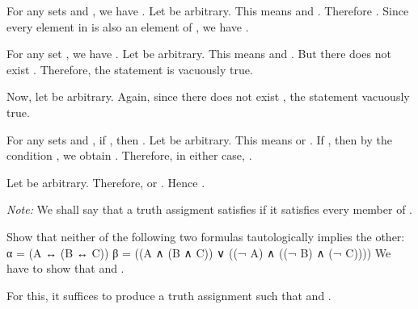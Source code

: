 \startexercises [title={\getvariable{document}{author}  \hfill  \getvariable{document}{course}  \hfill  2019-09-10}]
	
	\startexercise [title={Notes, 1.8}]
		For any sets  and , we have .
	\stopexercise
	\startsolution
		Let  be arbitrary. This means  and . Therefore . Since every element in  is also an element of , we have .
	\stopsolution

	\startexercise [title={Notes, 1.10}]
		For any set , we have .
	\stopexercise
	\startsolution
		Let  be arbitrary. This means  and . But there does not exist . Therefore, the statement is vacuously true.

		Now, let  be arbitrary. Again, since there does not exist , the statement vacuously true.
	\stopsolution

	\startexercise [title={Notes, 1.13}]
		For any sets  and , if , then .
	\stopexercise
	\startsolution
		Let  be arbitrary. This means  or . If , then by the condition , we obtain . Therefore, in either case, .

		Let  be arbitrary. Therefore,  or . Hence .
	\stopsolution

\stopexercises


\startexercises [title={\getvariable{document}{author}  \hfill  \getvariable{document}{course}  \hfill  2019-09-24}]

	\emph{Note:} We shall say that a truth assigment  satisfies  if it satisfies every member of .
	
	\startexercise [title={Enderton, 1.2.1}]
		Show that neither of the following two formulas tautologically implies the other:
		\startformula  \startalign[align={right, left}]
			\NC  α =  \NC  (A ↔ (B ↔ C))  \NR
			\NC  β =  \NC  ((A ∧ (B ∧ C)) ∨ ((¬ A) ∧ ((¬ B) ∧ (¬ C))))  \NR
		\stopalign  \stopformula
	\stopexercise
	\startsolution
		We have to show that  and .

		For this, it suffices to produce a truth assignment  such that  and .

